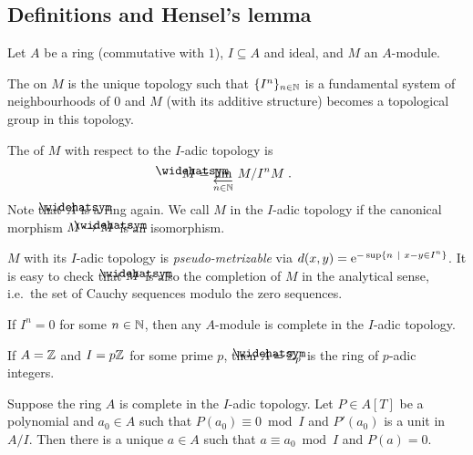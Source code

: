 \documentclass[a4paper,parskip=half,numbers=enddot, DIV=12]{scrreprt}
\begin{document}
\subsection{Definitions and Hensel's lemma}
\begin{defi}
	Let $A$ be a ring (commutative with $1$), $I\subseteq A$ and ideal, and $M$ an $A$-module.
	\begin{alphanumerate}
		\item The  on $M$ is the unique topology such that $\{I^n\}_{n\in \mathbb{N}}$ is a fundamental system of neighbourhoods of $0$ and $M$ (with its additive structure) becomes a topological group in this topology.
		\item The  of $M$ with respect to the $I$-adic topology is
		\begin{align*}
			\roof{M}=\limit[n\in \IN]M/I^nM\;.
		\end{align*}
		Note that $\roof{A}$ is a ring again. We call $M$  in the $I$-adic topology if the canonical morphism $M\morphism\roof{M}$ is an isomorphism.
	\end{alphanumerate}
\end{defi}
\begin{rem}
	$M$ with its $I$-adic topology is \emph{pseudo-metrizable} via $d(x,y)=\mathrm{e}^{-\sup\left\{n\ \middle|\  x-y\in I^n\right\}}$. It is easy to check that $\roof{M}$ is also the completion of $M$ in the analytical sense, i.e.\ the set of Cauchy sequences modulo the zero sequences.
\end{rem}
\begin{example}
	If $I^n=0$ for some $n\in \mathbb{N}$, then any $A$-module is complete in the $I$-adic topology.
\end{example}
\begin{example}
	If $A=\mathbb{Z}$ and $I=p\mathbb{Z}$ for some prime $p$, then $\roof{A}=\IZ_p$ is the ring of $p$-adic integers.
\end{example}
\begin{prop}
	Suppose the ring $A$ is complete in the $I$-adic topology. Let $P\in A[T]$ be a polynomial and $a_0\in A$ such that $P(a_0)\equiv 0\bmod I$ and $P'(a_0)$ is a unit in $A/I$. Then there is a unique $a\in A$ such that $a\equiv a_0\bmod I$ and $P(a)=0$.
\end{prop}
\end{document}
